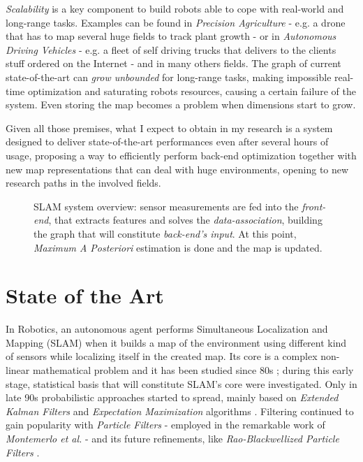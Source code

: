 \documentclass[10pt,a4paper, notitlepage]{report}
\begin{document}
\textit{Scalability} is a key component to build robots able to cope with real-world and long-range tasks. Examples can be found in \textit{Precision Agriculture} - e.g. a drone that has to map several huge fields to track plant growth - or in \textit{Autonomous Driving Vehicles} - e.g. a fleet of self driving trucks that delivers to the clients stuff ordered on the Internet - and in many others fields. The graph of current state-of-the-art can \textit{grow unbounded} for long-range tasks, making impossible real-time optimization and saturating robots resources, causing a certain failure of the system. Even storing the map becomes a problem when dimensions start to grow.

\vspace{10px}

Given all those premises, what I expect to obtain in my research is a system designed to deliver state-of-the-art performances even after several hours of usage, proposing a way to efficiently perform back-end optimization together with new map representations that can deal with huge environments, opening to new research paths in the involved fields.

\begin{figure}
    \centering
    \resizebox{0.8\textwidth}{!}{}
    \caption{SLAM system overview: sensor measurements are fed into the \textit{front-end}, that extracts features and solves the \textit{data-association}, building the graph that will constitute \textit{back-end's input}. At this point, \textit{Maximum A Posteriori} estimation is done and the map is updated.}
    \label{fig:slam-overview}
\end{figure}


\section*{State of the Art}
In Robotics, an autonomous agent performs Simultaneous Localization and Mapping (SLAM) when it builds a map of the environment using different kind of sensors while localizing itself in the created map. Its core is a complex non-linear mathematical problem and it has been studied since 80s \cite{durrant2006simultaneous} \cite{bailey2006simultaneous}; during this early stage, statistical basis that will constitute SLAM's core were investigated. Only in late 90s probabilistic approaches started to spread, mainly based on \textit{Extended Kalman Filters} \cite{leonard1990dynamic} \cite{dissanayake2001solution} and \textit{Expectation Maximization} algorithms \cite{dellaert2003mcmc} \cite{thrun2001probabilistic}. Filtering continued to gain popularity with \textit{Particle Filters} - employed in the remarkable work of \textit{Montemerlo et al.} \cite{montemerlo2002fastslam} - and its future refinements, like \textit{Rao-Blackwellized Particle Filters} \cite{grisetti2005improving} \cite{carlone2010rao} \cite{tipaldi2007heterogeneous}.
\end{document}
